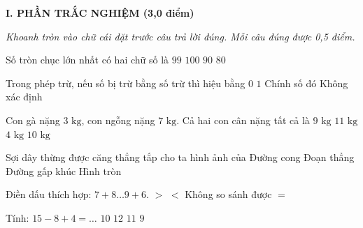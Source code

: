 
\setcounter{ex}{0}
\setcounter{bt}{0}

\textbf{\large I. PHẦN TRẮC NGHIỆM (3,0 điểm)}

{\itshape Khoanh tròn vào chữ cái đặt trước câu trả lời đúng. Mỗi câu đúng được 0,5 điểm.}

\begin{ex} %
Số tròn chục lớn nhất có hai chữ số là
\choice
{$99$}
{$100$}
{\True $90$}
{$80$}
\end{ex}

\begin{ex} %
Trong phép trừ, nếu số bị trừ bằng số trừ thì hiệu bằng
\choice
{\True $0$}
{$1$}
{Chính số đó}
{Không xác định}
\end{ex}

\begin{ex} %
Con gà nặng $3\text{ kg}$, con ngỗng nặng $7\text{ kg}$. Cả hai con cân nặng tất cả là
\choice
{$9\text{ kg}$}
{$11\text{ kg}$}
{$4\text{ kg}$}
{\True $10\text{ kg}$}
\end{ex}

\begin{ex} %
Sợi dây thừng được căng thẳng tắp cho ta hình ảnh của
\choice
{Đường cong}
{\True Đoạn thẳng}
{Đường gấp khúc}
{Hình tròn}
\end{ex}

\begin{ex} %
Điền dấu thích hợp: $7 + 8 \dots 9 + 6$.
\choice
{$>$}
{$<$}
{Không so sánh được}
{\True $=$}
\end{ex}

\begin{ex} %
Tính: $15 - 8 + 4 = \dots$
\choice
{$10$}
{$12$}
{\True $11$}
{$9$}
\end{ex}

